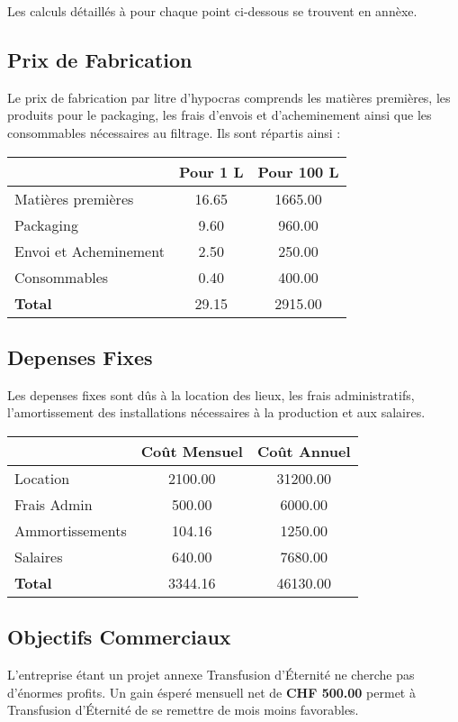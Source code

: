 \documentclass[10pt,a4paper]{article}
\newcommand{\tde}{Transfusion d'Éternité}
\begin{document}
Les calculs détaillés à pour chaque point ci-dessous se trouvent en annèxe.

\subsection{Prix de Fabrication}
Le prix de fabrication par litre d'hypocras comprends les matières premières, les produits pour le packaging, les frais d'envois et d'acheminement ainsi que les consommables nécessaires au filtrage.
Ils sont répartis ainsi :

\vspace{0.5cm}
\begin{tabular}{|l|S[table-format=4.2]|S[table-format=4.2]|}
\hline
& \textbf{Pour 1 L} & \textbf{Pour 100 L} \\\hline
Matières premières & 16.65 & 1665.00\\ 
Packaging & 9.60 & 960.00\\ 
Envoi et Acheminement & 2.50 & 250.00 \\
Consommables & 0.40 & 400.00\\\hline
\textbf{Total} & 29.15 & 2915.00\\\hline
\end{tabular}


\subsection{Depenses Fixes}
Les depenses fixes sont dûs à la location des lieux, les frais administratifs, l'amortissement des installations nécessaires à la production et aux salaires.

\vspace{0.5cm}
\begin{tabular}{|l|S[table-format=3.2]|S[table-format=3.2]|}
\hline
& \textbf{Coût Mensuel} & \textbf{Coût Annuel} \\\hline
Location & 2100.00 & 31200.00\\
Frais Admin & 500.00 & 6000.00 \\
Ammortissements & 104.16 & 1250.00\\
Salaires & 640.00 & 7680.00 \\\hline
\textbf{Total} & 3344.16 & 46130.00 \\\hline
\end{tabular}

\subsection{Objectifs Commerciaux}
L'entreprise étant un projet annexe \tde{} ne cherche pas d'énormes profits.
Un gain ésperé mensuell net de \textbf{CHF 500.00} permet à \tde{} de se remettre de mois moins favorables.
\end{document}
